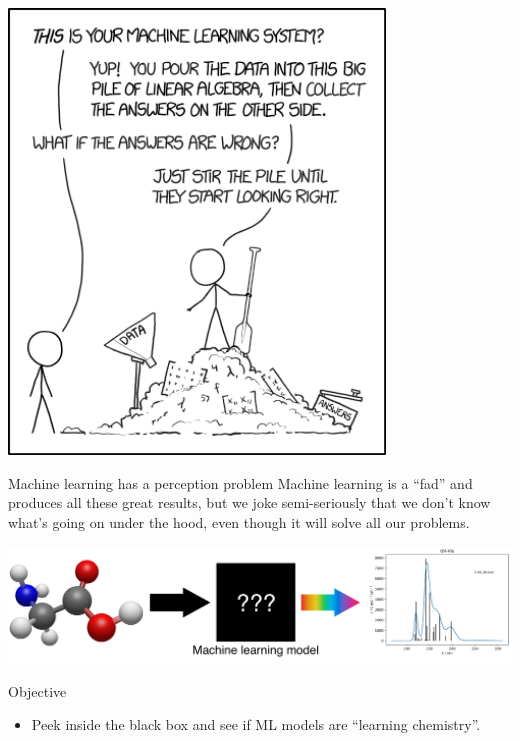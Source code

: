 \documentclass[compress]{beamer}
\begin{document}
\begin{frame}{}
  \begin{center}
    \includegraphics[width=0.75\textwidth]{./figures/machine_learning.png}
  \end{center}
\end{frame}

\begin{frame}{Machine learning has a perception problem}
  Machine learning is a ``fad'' and produces all these great results, but we joke semi-seriously that we don't know what's going on under the hood, even though it will solve all our problems.
  \begin{center}
    \includegraphics[width=1.00\textwidth]{./figures/black_box_prediction.pdf}
  \end{center}
\end{frame}

\begin{frame}{Objective}
  \begin{itemize}
  \item Peek inside the black box and see if ML models are ``learning chemistry''.
  \end{itemize}
\end{frame}
\end{document}
